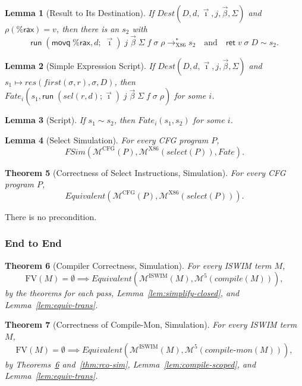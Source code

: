 \documentclass[10pt]{article}
\theoremstyle{acmplain}
\newtheorem{theorem}{Theorem}[section]
\newtheorem{lemma}[theorem]{Lemma}
\newcommand{\key}[1]{\mathsf{#1}}
\newcommand{\pass}[1]{\mathit{#1}}
\newcommand{\FV}{\mathrm{FV}}
\newcommand{\Mach}[1]{\mathcal{M}^{#1}}
\newcommand{\Equiv}{\mathit{Equivalent}}
\newcommand{\FSim}{\mathit{FSim}}
\newcommand{\rti}[3]{\key{ret}\;#1\;#2\;#3}
\newcommand{\lto}{\longrightarrow}
\newcommand{\rax}{\%\key{rax}}
\newcommand{\xrun}{\key{run}}
\begin{document}
\begin{lemma}[Result to Its Destination]\label{lem:to-dest}
If $\mathit{Dest}(D, d, \vec{\imath}, j, \vec{\beta}, \Sigma)$ and $\rho(\rax) = v$, then
there is an $s_2$ with
\[
  \xrun\;(\key{movq}\; \rax, d;\; \vec{\imath})\;j\;\vec{\beta}\;\Sigma\;f\;\sigma\;\rho \lto^*_{\mathrm{X86}} s_2
  \quad\text{and}\quad \rti{v}{\sigma}{D} \sim s_2 .
\]
\end{lemma}

\begin{lemma}[Simple Expression Script]\label{lem:sel-simple-sim}
If $\mathit{Dest}(D, d, \vec{\imath}, j, \vec{\beta}, \Sigma)$ and
$s_1 \mapsto \mathit{res}(\mathit{first}(\sigma, r), \sigma, D)$, then
$\mathit{Fate}_i(s_1, \xrun\;(\pass{sel}(r, d); \vec{\imath})\;j\;\vec{\beta}\;\Sigma\;f\;\sigma\;\rho)$
for some $i$.
\end{lemma}

\begin{lemma}[Script]\label{lem:fate}
If $s_1 \sim s_2$, then $\mathit{Fate}_i(s_1, s_2)$ for some $i$.
\end{lemma}

\begin{lemma}[Select Simulation]\label{lem:select-fsim}
For every CFG program $P$,
\[
  \FSim(\Mach{\mathrm{CFG}}(P), \Mach{\mathrm{X86}}(\pass{select}(P)), \mathit{Fate}) .
\]
\end{lemma}

\begin{theorem}[Correctness of Select Instructions, Simulation]\label{thm:select-sim}
For every CFG program $P$,
\[
  \Equiv(\Mach{\mathrm{CFG}}(P), \Mach{\mathrm{X86}}(\pass{select}(P))) .
\]
\end{theorem}
There is no precondition.

\subsubsection{End to End}

\begin{theorem}[Compiler Correctness, Simulation]\label{thm:compiler-sim}
For every ISWIM term $M$,
\[
  \FV(M) = \emptyset \implies \Equiv(\Mach{\mathrm{ISWIM}}(M), \Mach{5}(\pass{compile}(M))) ,
\]
by the theorems for each pass, Lemma~\ref{lem:simplify-closed}, and Lemma~\ref{lem:equiv-trans}.
\end{theorem}

\begin{theorem}[Correctness of Compile-Mon, Simulation]\label{thm:compile-mon-sim}
For every ISWIM term $M$,
\[
  \FV(M) = \emptyset \implies \Equiv(\Mach{\mathrm{ISWIM}}(M), \Mach{5}(\pass{compile\text{-}mon}(M))) ,
\]
by Theorems~\ref{thm:compiler-sim} and~\ref{thm:rco-sim}, Lemma~\ref{lem:compile-scoped},
and Lemma~\ref{lem:equiv-trans}.
\end{theorem}
\end{document}
